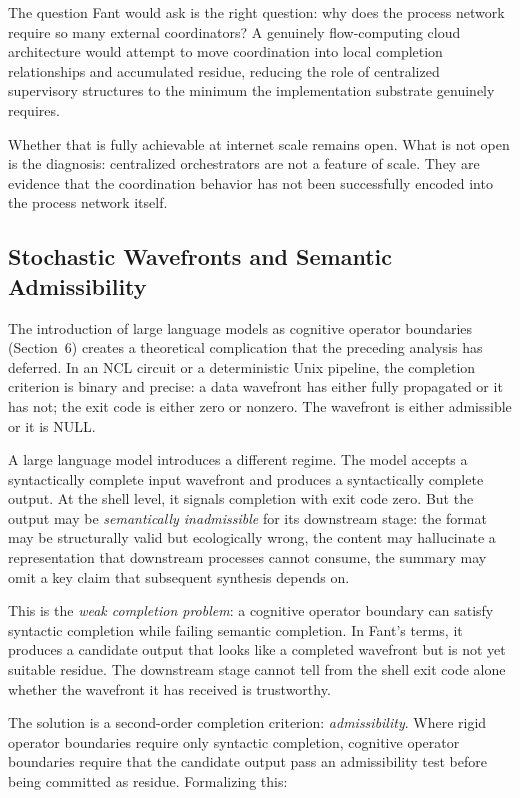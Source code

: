 \documentclass[12pt, a4paper]{article}
\begin{document}
The question Fant would ask is the right question: why does the
process network require so many external coordinators? A genuinely
flow-computing cloud architecture would attempt to move coordination
into local completion relationships and accumulated residue, reducing
the role of centralized supervisory structures to the minimum the
implementation substrate genuinely requires.

Whether that is fully achievable at internet scale remains open.
What is not open is the diagnosis: centralized orchestrators are
not a feature of scale. They are evidence that the coordination
behavior has not been successfully encoded into the process
network itself.

\subsection{Stochastic Wavefronts and Semantic Admissibility}

The introduction of large language models as cognitive operator
boundaries (Section~6) creates a theoretical complication that
the preceding analysis has deferred. In an NCL circuit or a
deterministic Unix pipeline, the completion criterion is binary
and precise: a data wavefront has either fully propagated or it
has not; the exit code is either zero or nonzero. The wavefront
is either admissible or it is NULL.

A large language model introduces a different regime. The model
accepts a syntactically complete input wavefront and produces a
syntactically complete output. At the shell level, it signals
completion with exit code zero. But the output may be
\emph{semantically inadmissible} for its downstream stage: the
format may be structurally valid but ecologically wrong, the
content may hallucinate a representation that downstream
processes cannot consume, the summary may omit a key claim that
subsequent synthesis depends on.

This is the \emph{weak completion problem}: a cognitive operator
boundary can satisfy syntactic completion while failing semantic
completion. In Fant's terms, it produces a candidate output
that looks like a completed wavefront but is not yet suitable
residue. The downstream stage cannot tell from the shell exit
code alone whether the wavefront it has received is trustworthy.

The solution is a second-order completion criterion:
\emph{admissibility}. Where rigid operator boundaries require
only syntactic completion, cognitive operator boundaries require
that the candidate output pass an admissibility test before
being committed as residue. Formalizing this:
\end{document}
